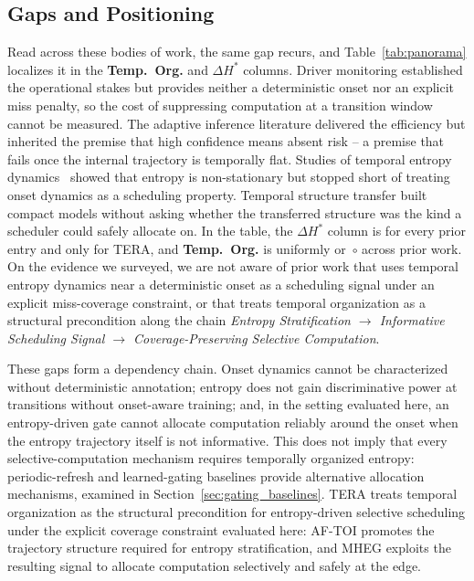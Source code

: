 \documentclass[a4paper,fleqn]{cas-dc}
\newcommand{\AFTOI}{\mbox{AF-TOI}\xspace}
\newcommand{\MHEG}{\mbox{MHEG}\xspace}
\begin{document}
\subsection{Gaps and Positioning}
\label{sec:rel_gap}
Read across these bodies of work, the same gap recurs, and Table~\ref{tab:panorama}
localizes it in the \textbf{Temp.~Org.} and \textbf{$\Delta H^{\ast}$} columns. Driver
monitoring established the operational stakes but provides neither a
deterministic onset nor an explicit miss penalty, so the cost of suppressing
computation at a transition window cannot be measured. The adaptive inference
literature delivered the efficiency but inherited the premise that high confidence
means absent risk -- a premise that fails once the internal trajectory is
temporally flat. Studies of temporal entropy
dynamics~\cite{braverman2020calib,dera2023trust}
showed that entropy is non-stationary but stopped short of treating onset
dynamics as a scheduling property. Temporal
structure transfer built compact models without asking whether the transferred
structure was the kind a scheduler could safely allocate on. In the table, the
\textbf{$\Delta H^{\ast}$} column is  for every prior entry and
 only for TERA, and \textbf{Temp.~Org.} is uniformly  or~$\circ$
across prior work. On the evidence we surveyed, we are not aware of prior work that
uses temporal entropy dynamics near a deterministic onset as a scheduling signal
under an explicit miss-coverage constraint, or that treats temporal organization as
a structural precondition along the chain
\emph{Entropy Stratification $\rightarrow$ Informative Scheduling Signal $\rightarrow$
Coverage-Preserving Selective Computation}.

These gaps form a dependency chain. Onset dynamics cannot be characterized
without deterministic annotation; entropy does not gain discriminative power at
transitions without onset-aware training; and, {\color{\revcolor}in the
setting evaluated here, an entropy-driven gate cannot allocate computation
reliably around the onset when the entropy trajectory itself is not
informative. This does not imply that every selective-computation mechanism
requires temporally organized entropy: periodic-refresh and learned-gating
baselines provide alternative allocation mechanisms, examined in
Section~\ref{sec:gating_baselines}.} TERA treats temporal organization as the
structural precondition for entropy-driven selective scheduling under the
explicit coverage constraint evaluated here: \AFTOI promotes the trajectory
structure required for entropy stratification, and \MHEG exploits the resulting
signal to allocate computation selectively and safely at the edge.
\end{document}
